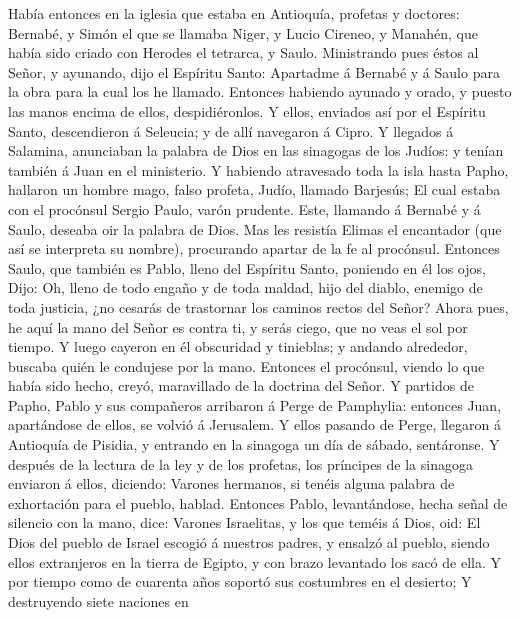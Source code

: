  Había entonces en la iglesia que estaba en Antioquía,
profetas y doctores: Bernabé, y Simón el que se llamaba Niger, y Lucio
Cireneo, y Manahén, que había sido criado con Herodes el tetrarca, y
Saulo.  Ministrando pues éstos al Señor, y ayunando, dijo el
Espíritu Santo: Apartadme á Bernabé y á Saulo para la obra para la cual
los he llamado.  Entonces habiendo ayunado y orado, y puesto
las manos encima de ellos, despidiéronlos.  Y ellos,
enviados así por el Espíritu Santo, descendieron á Seleucia; y de allí
navegaron á Cipro.  Y llegados á Salamina, anunciaban la
palabra de Dios en las sinagogas de los Judíos: y tenían también á Juan
en el ministerio.  Y habiendo atravesado toda la isla hasta
Papho, hallaron un hombre mago, falso profeta, Judío, llamado Barjesús;
 El cual estaba con el procónsul Sergio Paulo, varón
prudente. Este, llamando á Bernabé y á Saulo, deseaba oir la palabra de
Dios.  Mas les resistía Elimas el encantador (que así se
interpreta su nombre), procurando apartar de la fe al procónsul.
 Entonces Saulo, que también es Pablo, lleno del Espíritu
Santo, poniendo en él los ojos,  Dijo: Oh, lleno de todo
engaño y de toda maldad, hijo del diablo, enemigo de toda justicia, ¿no
cesarás de trastornar los caminos rectos del Señor?  Ahora
pues, he aquí la mano del Señor es contra ti, y serás ciego, que no veas
el sol por tiempo. Y luego cayeron en él obscuridad y tinieblas; y
andando alrededor, buscaba quién le condujese por la mano. 
Entonces el procónsul, viendo lo que había sido hecho, creyó,
maravillado de la doctrina del Señor.  Y partidos de Papho,
Pablo y sus compañeros arribaron á Perge de Pamphylia: entonces Juan,
apartándose de ellos, se volvió á Jerusalem.  Y ellos
pasando de Perge, llegaron á Antioquía de Pisidia, y entrando en la
sinagoga un día de sábado, sentáronse.  Y después de la
lectura de la ley y de los profetas, los príncipes de la sinagoga
enviaron á ellos, diciendo: Varones hermanos, si tenéis alguna palabra
de exhortación para el pueblo, hablad.  Entonces Pablo,
levantándose, hecha señal de silencio con la mano, dice: Varones
Israelitas, y los que teméis á Dios, oid:  El Dios del
pueblo de Israel escogió á nuestros padres, y ensalzó al pueblo, siendo
ellos extranjeros en la tierra de Egipto, y con brazo levantado los sacó
de ella.  Y por tiempo como de cuarenta años soportó sus
costumbres en el desierto;  Y destruyendo siete naciones en
